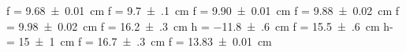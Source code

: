 f = \SI{+9.68(1)}{\centi\meter}
f = \SI{+9.7(1)}{\centi\meter}
f = \SI{+9.90(1)}{\centi\meter}
f = \SI{+9.88(2)}{\centi\meter}
f = \SI{+9.98(2)}{\centi\meter}
f = \SI{+16.2(3)}{\centi\meter}
h = \SI{-11.8(6)}{\centi\meter}
f = \SI{+15.5(6)}{\centi\meter}
h- = \SI{+15(1)}{\centi\meter}
f = \SI{+16.7(3)}{\centi\meter}
f = \SI{+13.83(1)}{\centi\meter}
